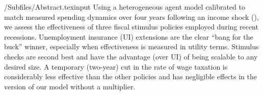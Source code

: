 \documentclass[HAFiscal]{subfiles}
\begin{document}



\author{Christopher D. Carroll\authNum \and Edmund Crawley\authNum \and Ivan Frankovic\authNum \and H{\aa}kon Tretvoll\authNum}

\keywords{}


\renewcommand{\forcedate}{December 4, 2022}\date{\forcedate}

\maketitle
\hypertarget{abstract}{}
\begin{verbatimwrite}{\econtexRoot/Subfiles/Abstract.texinput}
  Using a heterogeneous agent model calibrated to match measured spending dynamics over four years following an income shock (\cite{fagereng_mpc_2021}), we assess the effectiveness of three fiscal stimulus policies employed during recent recessions.  Unemployment insurance (UI) extensions are the clear ``bang for the buck'' winner, especially when effectiveness is measured in utility terms.  Stimulus checks are second best and have the advantage (over UI) of being scalable to any desired size.  A temporary (two-year) cut in the rate of wage taxation is considerably less effective than the other policies and has negligible effects in the version of our model without a multiplier.
\end{verbatimwrite}

\end{document}

